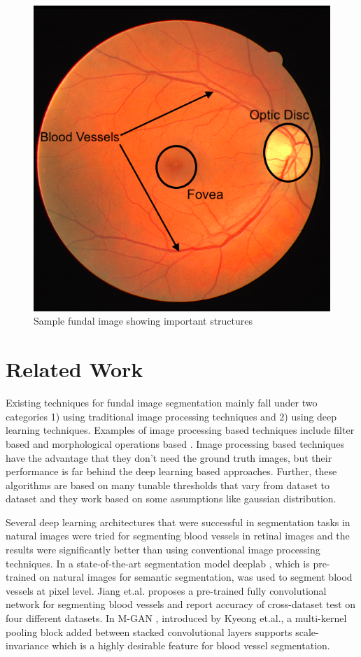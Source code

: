 \documentclass{article}
\begin{document}
\begin{figure}[!ht]
  \centering
  \includegraphics[width=0.5\linewidth]{images/eye_1.png}
  \caption{Sample fundal image showing important structures}
  \label{sample_funal_image}
\end{figure}

\section{Related Work}
Existing  techniques for fundal image segmentation mainly fall under two categories 1) using traditional image processing techniques and 2) using deep learning techniques.
Examples of image processing based techniques include filter based \cite{zhang2010retinal} \cite{yavuz2011retinal} \cite{aslan2018segmentation} and morphological operations based \cite{hassan2015retinal}\cite{singh2014new}.
Image processing based techniques have the advantage that they don’t need the ground truth images, but their performance is far behind the deep learning based approaches.
Further, these algorithms are based on many tunable thresholds that vary from dataset to dataset and they work based on some assumptions like gaussian distribution.

Several deep learning architectures that were successful in segmentation tasks \cite{chen2017deeplab} in natural images were tried for segmenting blood vessels in retinal images and the results were significantly better than using conventional image processing techniques.
In \cite{vengalil2016customizing} a state-of-the-art segmentation model deeplab \cite{chen2017deeplab}, which is pre-trained on natural images  for semantic segmentation,  was used to segment blood vessels at pixel level.
Jiang et.al. proposes \cite {jiang2018retinal} a  pre-trained fully convolutional network for segmenting blood vessels and report accuracy of cross-dataset test on four different datasets.
In M-GAN \cite{park2020m}, introduced by Kyeong et.al., a multi-kernel pooling block added between stacked convolutional layers supports scale-invariance which is a highly desirable feature for blood vessel segmentation.
\end{document}
